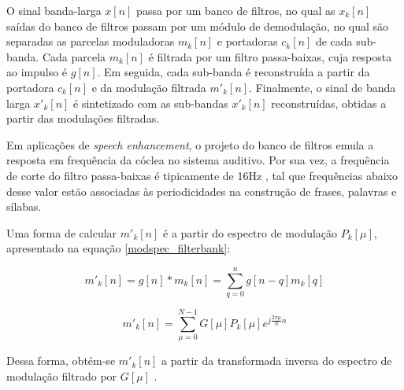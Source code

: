 O sinal banda-larga $x[n]$ passa por um banco de filtros, no qual as  $x_k[n]$
saídas do banco de filtros passam por um módulo de demodulação, no qual são
separadas as parcelas moduladoras $m_k[n]$ e portadoras $c_k[n]$ de cada
sub-banda. Cada parcela $m_k[n]$ é filtrada por um filtro passa-baixas, cuja
resposta ao impulso é $g[n]$. Em seguida, cada sub-banda é reconstruída a partir da portadora
$c_k[n]$ e da modulação filtrada $m'_k[n]$. Finalmente, o sinal de banda larga
$x'_k[n]$ é sintetizado com as sub-bandas $x'_k[n]$ reconstruídas, obtidas a
partir das modulações filtradas.

Em aplicações de \textit{speech enhancement}, o projeto do banco de filtros
emula a resposta em frequência da cóclea no sistema auditivo. Por sua vez, a
frequência de corte do filtro passa-baixas é tipicamente de 16Hz
\cite{drullman1994}, tal que frequências abaixo desse valor estão associadas às
periodicidades na construção de frases, palavras e sílabas.

Uma forma de calcular $m'_k[n]$ é a partir do espectro de modulação $P_k[\mu]$,
apresentado na equação \ref{modspec_filterbank}:

\begin{equation}
    m'_k[n] = g[n] \ast m_k[n] = \sum_{q = 0}^{n} g[n - q] m_k[q]
\end{equation}

\begin{equation}
    m'_k[n] = \sum_{\mu=0}^{N-1} G[\mu]P_k[\mu] e^{j \frac{2 \pi \mu}{N} n}
\end{equation}  

Dessa forma, obtém-se $m'_k[n]$ a partir da transformada inversa do espectro de
modulação filtrado por $G[\mu]$ \cite{toolbox2010}.

